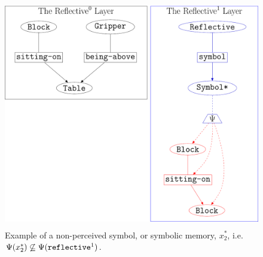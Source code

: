 \begin{figure}
\center
\includegraphics[height=10cm]{gfx/example_symbolic_memory}
\caption[Example of a non-perceived symbol, or symbolic
  memory.]{Example of a non-perceived symbol, or symbolic memory,
  $x_2^*$,
  i.e. $\Psi(x_2^*)\not\subseteq\Psi(\text{\tt{reflective}}^1)$.}
\label{figure:example_symbolic_memory}
\end{figure}


